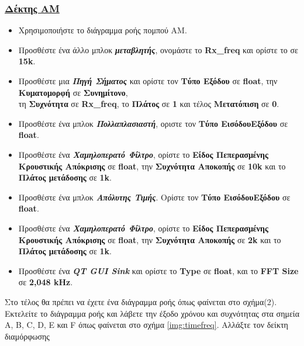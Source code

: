 \documentclass[12pt]{report}
\begin{document}
            \subsubsection*{\textsf{\underline{Δέκτης ΑΜ}}}
            \begin{itemize}
                \item Χρησιμοποιήστε το διάγραμμα ροής πομπού AM.
                \item Προσθέστε ένα άλλο μπλοκ \textbf{\textit{μεταβλητής}}, 
                    ονομάστε το \textbf{Rx\_freq} και ορίστε το σε \textbf{15k}.
                \item Προσθέστε μια \textbf{\textit{Πηγή Σήματος}} και ορίστε τον \textbf{Τύπο Εξόδου}
                σε \textbf{float}, την \textbf{Κυματομορφή} σε \textbf{Συνημίτονο},\\
                τη \textbf{Συχνότητα} σε \textbf{Rx\_freq}, το \textbf{Πλάτος} σε \textbf{1} και τέλος 
                \textbf{Μετατόπιση} σε \textbf{0}.
                \item Προσθέστε ένα μπλοκ \textbf{\textit{Πολλαπλασιαστή}}, οριστε τον 
                 \textbf{Τύπο ΕισόδουΕξόδου} σε \textbf{float}.
                \item Προσθέστε ένα \textbf{\textit{Χαμηλοπερατό Φίλτρο}}, ορίστε το 
                 \textbf{Είδος Πεπερασμένης Κρουστικής Απόκρισης} σε \textbf{float}, 
                 την \textbf{Συχνότητα Αποκοπής} σε \textbf{10k} και το \textbf{Πλάτος μετάδοσης} σε \textbf{1k}.
                \item Προσθέστε ένα μπλοκ \textbf{\textit{Απόλυτης Τιμής}}. 
                 Ορίστε τον \textbf{Τύπο ΕισόδουΕξόδου} σε \textbf{float}.
                \item Προσθέστε ένα \textbf{\textit{Χαμηλοπερατό Φίλτρο}}, ορίστε το 
                 \textbf{Είδος Πεπερασμένης Κρουστικής Απόκρισης} σε \textbf{float}, 
                 την \textbf{Συχνότητα Αποκοπής} σε \textbf{2k} και το \textbf{Πλάτος μετάδοσης} σε \textbf{1k}.
                \item Προσθέστε ένα \textbf{\textit{QT GUI Sink}} και ορίστε το \textbf{Type} σε
                 \textbf{float}, και το \textbf{FFT Size} σε \textbf{2,048 kHz}.
            \end{itemize}
            Στο τέλος θα πρέπει να έχετε ένα διάγραμμα ροής όπως φαίνεται στο σχήμα(2). 
            Εκτελείτε το διάγραμμα ροής και λάβετε την έξοδο χρόνου και συχνότητας στα σημεία 
            A, B, C, D, E και F όπως φαίνεται στο σχήμα \ref{img:timefreq}. Αλλάξτε τον δείκτη διαμόρφωσης
\end{document}
